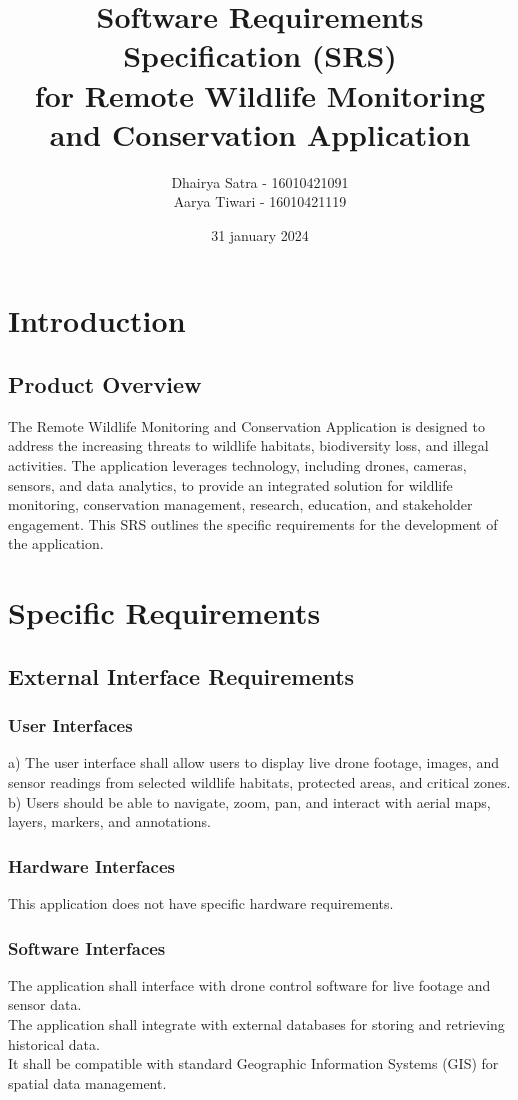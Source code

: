 \documentclass{article}
\title{Software Requirements Specification (SRS)\\for Remote Wildlife Monitoring and Conservation Application}
\author{ Dhairya Satra - 16010421091\\Aarya Tiwari - 16010421119}
\date{31 january 2024}
\begin{document}
\maketitle

\section{Introduction}

\subsection{Product Overview}
The Remote Wildlife Monitoring and Conservation Application is designed to address the increasing threats to wildlife habitats, biodiversity loss, and illegal activities. The application leverages technology, including drones, cameras, sensors, and data analytics, to provide an integrated solution for wildlife monitoring, conservation management, research, education, and stakeholder engagement. This SRS outlines the specific requirements for the development of the application.

\section{Specific Requirements}

\subsection{External Interface Requirements}

\subsubsection{User Interfaces}
a) The user interface shall allow users to display live drone footage, images, and sensor readings from selected wildlife habitats, protected areas, and critical zones.\\
b) Users should be able to navigate, zoom, pan, and interact with aerial maps, layers, markers, and annotations.

\subsubsection{Hardware Interfaces}
This application does not have specific hardware requirements.

\subsubsection{Software Interfaces}
The application shall interface with drone control software for live footage and sensor data.\\
The application shall integrate with external databases for storing and retrieving historical data.\\
It shall be compatible with standard Geographic Information Systems (GIS) for spatial data management.
\end{document}

